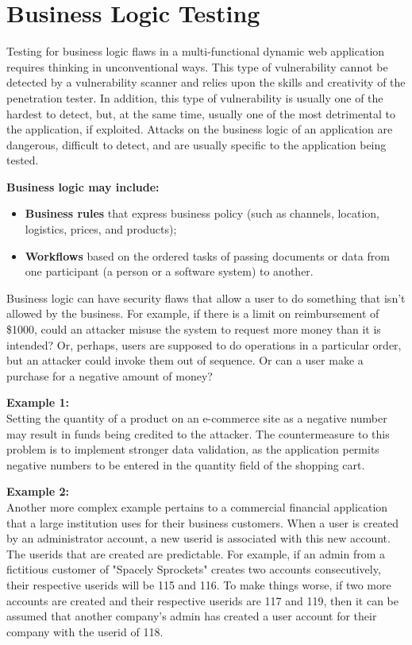 \chapter{Business Logic Testing}

	Testing for business logic flaws in a multi-functional dynamic web application requires thinking 
	in unconventional ways. This type of vulnerability cannot be detected by a vulnerability scanner 
	and relies upon the skills and creativity of the penetration tester. In addition, this type of
	vulnerability is usually one of the hardest to detect, but, at the same time, usually one of the 
	most detrimental to the application, if exploited. Attacks on the business logic of an application 
	are dangerous, difficult to detect, and are usually specific to the application being tested.

	{\bf Business logic may include:}
	\begin{itemize}
		\item {\bf Business rules} that express business policy (such as channels, location, logistics, 
		prices, and products);
		\item  {\bf Workflows} based on the ordered tasks of passing documents or data from one participant 
		(a person or a software system) to another. 
	\end{itemize}


	Business logic can have security flaws that allow a user to do something that isn't allowed by the
	business. For example, if there is a limit on reimbursement of \$1000, could an attacker misuse the 
	system to request more money than it is intended? Or, perhaps, users are supposed to do operations 
	in a particular order, but an attacker could invoke them out of sequence. Or can a user make a 
	purchase for a negative amount of money?

	{\bf Example 1:}\\
	Setting the quantity of a product on an e-commerce site as a negative number may result in funds 
	being credited to the attacker. The countermeasure to this problem is to implement stronger data
	validation, as the application permits negative numbers to be entered in the quantity field of 
	the shopping cart.

	{\bf Example 2:} \\
	Another more complex example pertains to a commercial financial application that a large institution 
	uses for their business customers. When a user is created by an administrator account, a new userid 
	is associated with this new account. The userids that are created are predictable. For example, 
	if an admin from a fictitious customer of "Spacely Sprockets" creates two accounts consecutively, 
	their respective userids will be 115 and 116. To make things worse, if two more accounts are created 
	and their respective userids are 117 and 119, then it can be assumed that another company's admin 
	has created a user account for their company with the userid of 118.

